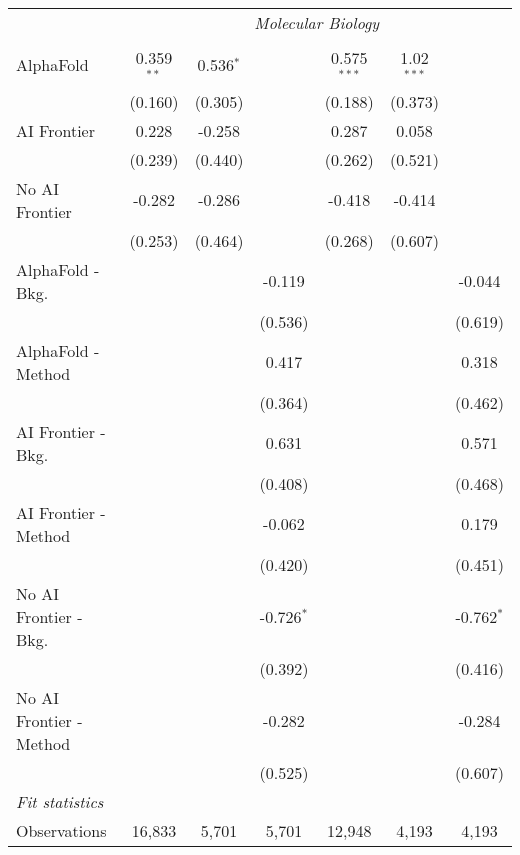 \begin{tabular}{lcccccc}
 & \multicolumn{6}{c}{\textit{Molecular Biology}} \\ \\
   AlphaFold               & 0.359$^{**}$ & 0.536$^{*}$ &              & 0.575$^{***}$ & 1.02$^{***}$ &   \\   
                           & (0.160)      & (0.305)     &              & (0.188)       & (0.373)      &   \\   
   AI Frontier             & 0.228        & -0.258      &              & 0.287         & 0.058        &   \\   
                           & (0.239)      & (0.440)     &              & (0.262)       & (0.521)      &   \\   
   No AI Frontier          & -0.282       & -0.286      &              & -0.418        & -0.414       &   \\   
                           & (0.253)      & (0.464)     &              & (0.268)       & (0.607)      &   \\   
   AlphaFold - Bkg.        &              &             & -0.119       &               &              & -0.044\\   
                           &              &             & (0.536)      &               &              & (0.619)\\   
   AlphaFold - Method      &              &             & 0.417        &               &              & 0.318\\   
                           &              &             & (0.364)      &               &              & (0.462)\\   
   AI Frontier - Bkg.      &              &             & 0.631        &               &              & 0.571\\   
                           &              &             & (0.408)      &               &              & (0.468)\\   
   AI Frontier - Method    &              &             & -0.062       &               &              & 0.179\\   
                           &              &             & (0.420)      &               &              & (0.451)\\   
   No AI Frontier - Bkg.   &              &             & -0.726$^{*}$ &               &              & -0.762$^{*}$\\   
                           &              &             & (0.392)      &               &              & (0.416)\\   
   No AI Frontier - Method &              &             & -0.282       &               &              & -0.284\\   
                           &              &             & (0.525)      &               &              & (0.607)\\   
   \midrule
   \emph{Fit statistics}\\
   Observations            & 16,833       & 5,701       & 5,701        & 12,948        & 4,193        & 4,193\\  
   

\end{tabular}
